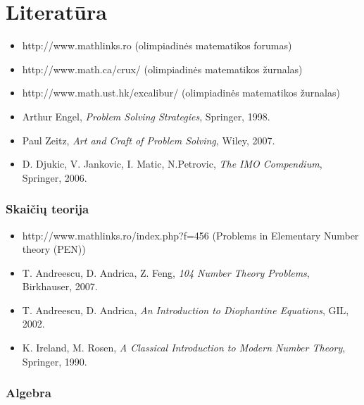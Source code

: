 \pagestyle{empty}
\section*{Literatūra}

\begin{itemize}
  \item http://www.mathlinks.ro \quad (olimpiadinės matematikos forumas)
  \item http://www.math.ca/crux/ \quad (olimpiadinės matematikos žurnalas)
  \item http://www.math.ust.hk/excalibur/ \quad (olimpiadinės matematikos žurnalas)
  \item Arthur Engel, \emph{Problem Solving Strategies}, Springer, 1998.
  \item Paul Zeitz, \emph{Art and Craft of Problem Solving}, Wiley, 2007.
  \item D. Djukic, V. Jankovic, I. Matic, N.Petrovic, \emph{The IMO
    Compendium}, Springer, 2006.
\end{itemize}


\subsubsection{Skaičių teorija}

\begin{itemize}
  \item http://www.mathlinks.ro/index.php?f=456 \quad(Problems in Elementary
    Number theory (PEN))
  \item T. Andreescu, D. Andrica, Z. Feng, \emph{104 Number Theory
    Problems}, Birkhauser, 2007.
  \item T. Andreescu, D. Andrica, \emph{An Introduction to Diophantine
    Equations}, GIL, 2002.
  \item K. Ireland, M. Rosen, \emph{A Classical Introduction to Modern
    Number Theory}, Springer, 1990.
\end{itemize}

\subsubsection{Algebra}

